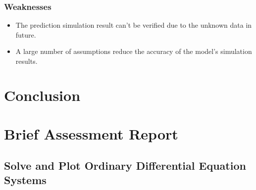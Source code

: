\documentclass{mcmthesis}
\begin{document}
\subsubsection{Weaknesses}
\begin{itemize}
	\item The prediction simulation result can't be verified due to the unknown data in future.  
	\item A large number of assumptions reduce the accuracy of the model’s simulation results.
\end{itemize}


\section{Conclusion}\label{S8}


\newpage





\section*{Brief Assessment Report}\label{S9}

\newpage

\begin{appendices}

\section{Solve and Plot Ordinary Differential Equation Systems}


\end{appendices}


\newpage



    
	
\end{document}
